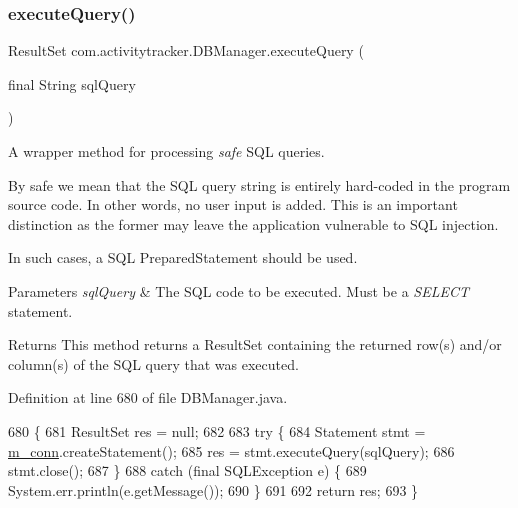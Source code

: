 \mbox{\label{classcom_1_1activitytracker_1_1_d_b_manager_adef71a18dc05536d80e83311841e1953}} 
\subsubsection{\texorpdfstring{execute\+Query()}{executeQuery()}}
{\footnotesize\ttfamily Result\+Set com.\+activitytracker.\+D\+B\+Manager.\+execute\+Query (\begin{DoxyParamCaption}\item[{final String}]{sql\+Query }\end{DoxyParamCaption})\hspace{0.3cm}{\ttfamily [private]}}

A wrapper method for processing {\itshape safe} S\+QL queries.

By safe we mean that the S\+QL query string is entirely hard-\/coded in the program source code. In other words, no user input is added. This is an important distinction as the former may leave the application vulnerable to S\+QL injection.

In such cases, a S\+QL Prepared\+Statement should be used.


\begin{DoxyParams}{Parameters}
{\em sql\+Query} & The S\+QL code to be executed. Must be a {\itshape S\+E\+L\+E\+CT} statement.\\
\hline
\end{DoxyParams}
\begin{DoxyReturn}{Returns}
This method returns a Result\+Set containing the returned row(s) and/or column(s) of the S\+QL query that was executed. 
\end{DoxyReturn}


Definition at line 680 of file D\+B\+Manager.\+java.


\begin{DoxyCode}
680                                                           \{
681         ResultSet res = null;
682 
683         \textcolor{keywordflow}{try} \{
684             Statement stmt = \mbox{\hyperlink{classcom_1_1activitytracker_1_1_d_b_manager_a064088d13ac09eb147fdc19268771521}{m\_conn}}.createStatement();
685             res = stmt.executeQuery(sqlQuery);
686             stmt.close();
687         \}
688         \textcolor{keywordflow}{catch} (\textcolor{keyword}{final} SQLException e) \{
689             System.err.println(e.getMessage());
690         \}
691 
692         \textcolor{keywordflow}{return} res;
693     \}
\end{DoxyCode}
\mbox{\label{classcom_1_1activitytracker_1_1_d_b_manager_a382397e2bdf309901d1c80ff66be69b7}} 
